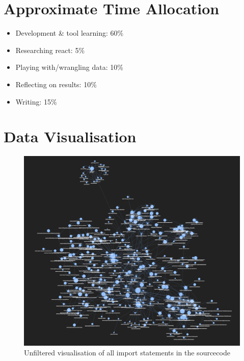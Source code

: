 \documentclass{article}
\begin{document}
\clearpage
\section{Approximate Time Allocation}
\label{apx:c}
\begin{itemize}
  \item Development \& tool learning: 60\%
  \item Researching react: 5\%
  \item Playing with/wrangling data: 10\%
  \item Reflecting on results: 10\%
  \item Writing: 15\%
\end{itemize}

\clearpage
\section{Data Visualisation}
\label{apx:d}

\begin{figure}[h]
\includegraphics[width=\textwidth]{graphics/raw_imports.png}
\caption{Unfiltered visualisation of all import statements in the sourcecode}
\label{fig:d:raw}
\end{figure}
\end{document}
